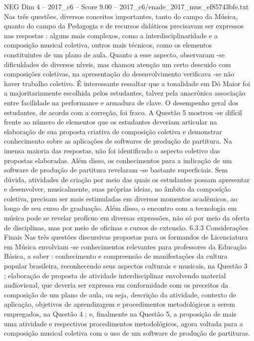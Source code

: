 \begin{textsample}{NEG Dim 4 – 2017\_c6 – Score 9.00 – 2017\_c6/enade\_2017\_mus\_ef85743bfe.txt}
Nas três questões, diversos conceitos importantes, tanto do campo da Música, quanto do campo da Pedagogia e de recursos didáticos precisavam ser expressos nas respostas : alguns mais complexos, como a interdisciplinaridade e a composição musical coletiva, outros mais técnicos, como os elementos constituintes de um plano de aula.
Quanto a esse aspecto, observaram -se dificuldades de diversos níveis, mas chamou atenção um certo descuido com composições coletivas, na apresentação do desenvolvimento verificava -se não haver trabalho coletivo.
É interessante ressaltar que a tonalidade em Dó Maior foi a majoritariamente escolhida pelos estudantes, talvez pela anacrônica associação entre facilidade na performance e armadura de clave.
O desempenho geral dos estudantes, de acordo com a correção, foi fraco.
A Questão 5 mostrou -se difícil frente ao número de elementos que os estudantes deveriam articular na elaboração de sua proposta criativa de composição coletiva e demonstrar conhecimento sobre as aplicações de softwares de produção de partitura.
Na imensa maioria das respostas, não foi identificado o aspecto coletivo das propostas elaboradas.
Além disso, os conhecimentos para a indicação de um software de produção de partitura revelaram -se bastante superficiais.
Sem dúvida, atividades de criação por meio das quais os estudantes possam apresentar e desenvolver, musicalmente, suas próprias ideias, no âmbito da composição coletiva, precisam ser mais estimuladas em diversos momentos acadêmicos, ao longo de seu curso de graduação.
Além disso, o encontro com a tecnologia em música pode se revelar profícuo em diversas expressões, não só por meio da oferta de disciplinas, mas por meio de oficinas e cursos de extensão. 6.3.3 Considerações Finais Nas três questões discursivas propostas para os formandos de Licenciatura em Música envolviam -se conhecimentos relevantes para professores da Educação Básica, a saber : conhecimento e compreensão de manifestações da cultura popular brasileira, reconhecendo seus aspectos culturais e musicais, na Questão 3 ; elaboração de proposta de atividade interdisciplinar envolvendo material audiovisual, que deveria ser expressa em conformidade com os preceitos da composição de um plano de aula, ou seja, descrição da atividade, contexto de aplicação, objetivos de aprendizagem e procedimentos metodológicos a serem empregados, na Questão 4 ; e, finalmente na Questão 5, a proposição de mais uma atividade e respectivos procedimentos metodológicos, agora voltada para a composição musical coletiva com o uso de um software de produção de partituras.

\end{textsample}
